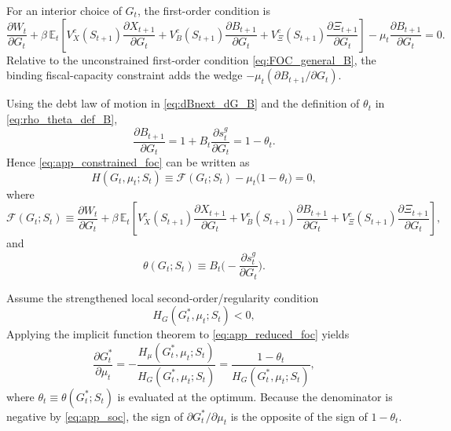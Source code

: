 \documentclass[12pt]{article}
\begin{document}
For an interior choice of $G_t$, the first-order condition is
\begin{equation}
  \frac{\partial W_t}{\partial G_t}
  + \beta\,\mathbb{E}_t\!\left[
    V_X^c(S_{t+1})\frac{\partial X_{t+1}}{\partial G_t}
    +V_B^c(S_{t+1})\frac{\partial B_{t+1}}{\partial G_t}
    +V_{\Xi}^c(S_{t+1})\frac{\partial \Xi_{t+1}}{\partial G_t}
  \right]
  - \mu_t\frac{\partial B_{t+1}}{\partial G_t}
  =0.
  \label{eq:app_constrained_foc}
\end{equation}
Relative to the unconstrained first-order condition \eqref{eq:FOC_general_B}, the binding fiscal-capacity constraint adds the wedge
$-\mu_t(\partial B_{t+1}/\partial G_t)$.

Using the debt law of motion in \eqref{eq:dBnext_dG_B} and the definition of $\theta_t$ in \eqref{eq:rho_theta_def_B},
\begin{equation}
  \frac{\partial B_{t+1}}{\partial G_t}
  =
  1 + B_t\frac{\partial s_t^g}{\partial G_t}
  =
  1-\theta_t.
  \label{eq:app_dB_dG_theta}
\end{equation}
Hence \eqref{eq:app_constrained_foc} can be written as
\begin{equation}
  H(G_t,\mu_t;S_t)
  \equiv
  \mathcal{F}(G_t;S_t) - \mu_t\big(1-\theta_t\big)=0,
  \label{eq:app_reduced_foc}
\end{equation}
where
\begin{equation}
  \mathcal{F}(G_t;S_t)
  \equiv
  \frac{\partial W_t}{\partial G_t}
  + \beta\,\mathbb{E}_t\!\left[
    V_X^c(S_{t+1})\frac{\partial X_{t+1}}{\partial G_t}
    +V_B^c(S_{t+1})\frac{\partial B_{t+1}}{\partial G_t}
    +V_{\Xi}^c(S_{t+1})\frac{\partial \Xi_{t+1}}{\partial G_t}
  \right],
  \label{eq:app_F_def}
\end{equation}
and
\begin{equation}
  \theta(G_t;S_t) \equiv B_t\Big(-\frac{\partial s_t^g}{\partial G_t}\Big).
  \label{eq:app_theta_function}
\end{equation}

Assume the strengthened local second-order/regularity condition
\begin{equation}
  H_G(G_t^*,\mu_t;S_t) <0,
  \label{eq:app_soc}
\end{equation}
 Applying the implicit function theorem to \eqref{eq:app_reduced_foc} yields
\begin{equation}
  \frac{\partial G_t^*}{\partial \mu_t}
  =
  -\frac{H_{\mu}(G_t^*,\mu_t;S_t)}{H_G(G_t^*,\mu_t;S_t)}
  =
  \frac{1-\theta_t}{H_G(G_t^*,\mu_t;S_t)},
  \label{eq:app_dG_dmu}
\end{equation}
where $\theta_t\equiv \theta(G_t^*;S_t)$ is evaluated at the optimum. Because the denominator is negative by \eqref{eq:app_soc},
the sign of $\partial G_t^*/\partial \mu_t$ is the opposite of the sign of $1-\theta_t$. 
\end{document}
